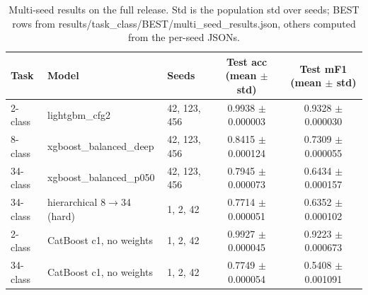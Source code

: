 \begin{table}[!t]
\centering
\caption{Multi-seed results on the full release. Std is the population std over seeds; BEST rows from results/{task}\_class/BEST/multi\_seed\_results.json, others computed from the per-seed JSONs.}\label{tab:multiseed}
\scriptsize
\setlength{\tabcolsep}{3pt}
\begin{tabular}{llp{1.6cm}cc}
\toprule
\textbf{Task} & \textbf{Model} & \textbf{Seeds} & \textbf{Test acc (mean $\pm$ std)} & \textbf{Test mF1 (mean $\pm$ std)} \\
\midrule
2-class & lightgbm\_cfg2 & 42, 123, 456 & 0.9938 $\pm$ 0.000003 & 0.9328 $\pm$ 0.000030 \\
8-class & xgboost\_balanced\_deep & 42, 123, 456 & 0.8415 $\pm$ 0.000124 & 0.7309 $\pm$ 0.000055 \\
34-class & xgboost\_balanced\_p050 & 42, 123, 456 & 0.7945 $\pm$ 0.000073 & 0.6434 $\pm$ 0.000157 \\
34-class & hierarchical 8$\rightarrow$34 (hard) & 1, 2, 42 & 0.7714 $\pm$ 0.000051 & 0.6352 $\pm$ 0.000102 \\
2-class & CatBoost c1, no weights & 1, 2, 42 & 0.9927 $\pm$ 0.000045 & 0.9223 $\pm$ 0.000673 \\
34-class & CatBoost c1, no weights & 1, 2, 42 & 0.7749 $\pm$ 0.000054 & 0.5408 $\pm$ 0.001091 \\
\bottomrule
\end{tabular}
\end{table}
